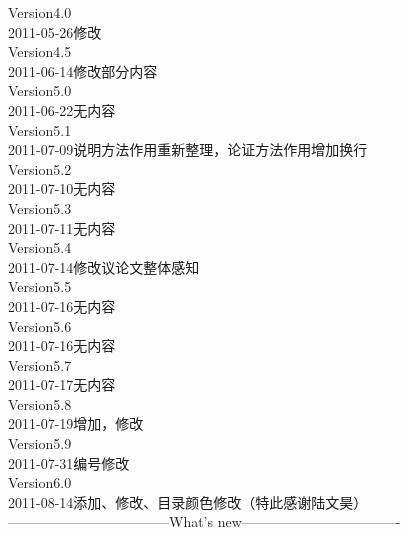 Version4.0\\
2011-05-26修改\\%
Version4.5\\
2011-06-14修改部分内容\\%
Version5.0\\
2011-06-22无内容\\%
Version5.1\\
2011-07-09说明方法作用重新整理，论证方法作用增加换行\\
Version5.2\\
2011-07-10无内容\\%
Version5.3\\
2011-07-11无内容\\%
Version5.4\\
2011-07-14修改议论文整体感知\\
Version5.5\\
2011-07-16无内容\\%
Version5.6\\
2011-07-16无内容\\%
Version5.7\\
2011-07-17无内容\\%
Version5.8\\
2011-07-19增加，修改\\
Version5.9\\
2011-07-31编号修改\\
Version6.0\\
2011-08-14添加、修改、目录颜色修改（特此感谢陆文昊）\\
-----------------------------------What's new----------------------------------\\
